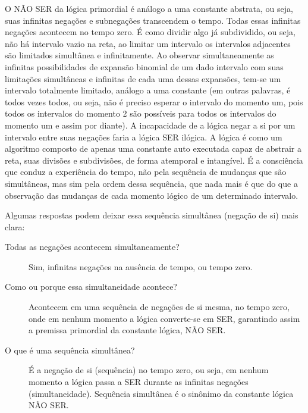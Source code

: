 O NÃO SER da lógica primordial é análogo a uma constante abstrata, ou seja, suas infinitas negações e subnegações transcendem o tempo. Todas essas infinitas negações acontecem no tempo zero. É como dividir algo já subdividido, ou seja, não há intervalo vazio na reta, ao limitar um intervalo os intervalos adjacentes são limitados simultânea e infinitamente. Ao observar simultaneamente as infinitas possibilidades de expansão binomial de um dado intervalo com suas limitações simultâneas e infinitas de cada uma dessas expansões, tem-se um intervalo totalmente limitado, análogo a uma constante (em outras palavras, é todos vezes todos, ou seja, não é preciso esperar o intervalo do momento um, pois todos os intervalos do momento 2 são possíveis para todos os intervalos do momento um e assim por diante). A incapacidade de a lógica negar a si por um intervalo entre suas negações faria a lógica SER ilógica. A lógica é como um algoritmo composto de apenas uma constante auto executada capaz de abstrair a reta, suas divisões e subdivisões, de forma atemporal e intangível. É a consciência que conduz a experiência do tempo, não pela sequência de mudanças que são simultâneas, mas sim pela ordem dessa sequência, que nada mais é que do que a observação das mudanças de cada momento lógico de um determinado intervalo.

Algumas respostas podem deixar essa sequência simultânea (negação de si) mais clara:
\begin{description}
   \item[Todas as negações acontecem simultaneamente?] Sim, infinitas negações na ausência de tempo, ou tempo zero.
   \item[Como ou porque essa simultaneidade acontece?] Acontecem em uma sequência de negações de si mesma, no tempo zero, onde em nenhum momento a lógica converte-se em SER, garantindo assim a premissa primordial da constante lógica, NÃO SER.
   \item[O que é uma sequência simultânea?] É a negação de si (sequência) no tempo zero, ou seja, em nenhum momento a lógica passa a SER durante as infinitas negações (simultaneidade). Sequência simultânea é o sinônimo da constante lógica NÃO SER.
\end{description}